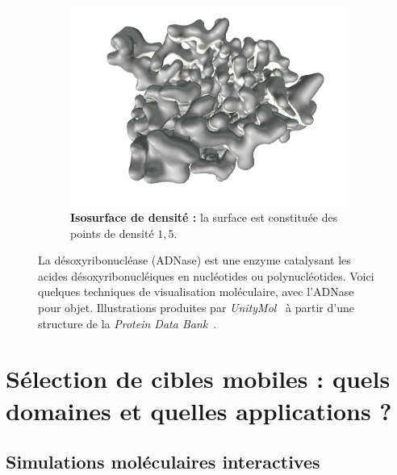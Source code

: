 \begin{appendices}
\begin{figure}[!htbp]
\begin{subfigure}[t]{\subImgW}
		\end{subfigure}
		~
		\begin{subfigure}[t]{\subImgW}
			\centering
			\includegraphics[width=\textwidth]{./figures/ch1/4awn_iso_1_5}
			\caption[Isosurface de densité]{\textbf{Isosurface de densité :} la surface est constituée des points de densité $1,5$.}
			\label{fig:4awn_iso_1_5}
		\end{subfigure}
		\caption[Modes de représentation moléculaire]{La désoxyribonucléase (ADNase) est une enzyme catalysant les acides désoxyribonucléiques en nucléotides ou polynucléotides. Voici quelques techniques de visualisation moléculaire, avec l'ADNase pour objet. Illustrations produites par \emph{UnityMol}~\cite{doutreligne2014unitymol} à partir d'une structure de la \emph{Protein Data Bank}~\cite{parsiegla2012structure}.}
		\label{fig:4awn_atom}
	\end{figure}
	
	
	


\cleardoublepage
\FloatBarrier
\chapter[Sélection de cibles mobiles : applications]{Sélection de cibles mobiles : quels domaines et quelles applications ?}
\minitoc
\label{appendix:annexeB}


\section{Simulations moléculaires interactives}


\end{appendices}
